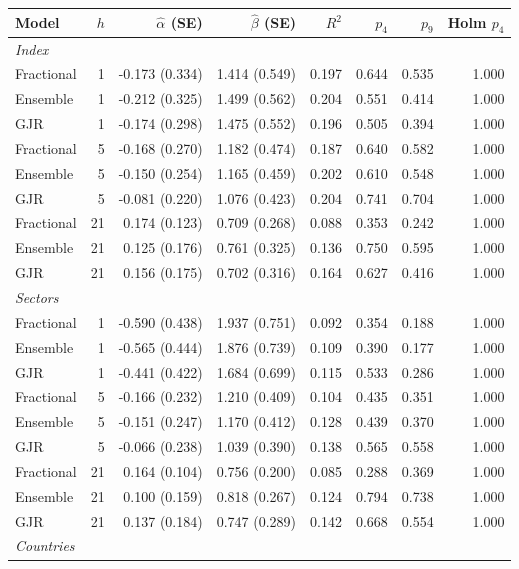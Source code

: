 \begin{tabular}{lrrrrrrr}
\toprule
Model & $h$ & $\widehat\alpha$ (SE) & $\widehat\beta$ (SE) & $R^2$ & $p_4$ & $p_9$ & Holm $p_4$ \\
\midrule
\multicolumn{8}{l}{\textit{Index}} \\
Fractional & 1 & -0.173 (0.334) & 1.414 (0.549) & 0.197 & 0.644 & 0.535 & 1.000 \\
Ensemble & 1 & -0.212 (0.325) & 1.499 (0.562) & 0.204 & 0.551 & 0.414 & 1.000 \\
GJR & 1 & -0.174 (0.298) & 1.475 (0.552) & 0.196 & 0.505 & 0.394 & 1.000 \\
Fractional & 5 & -0.168 (0.270) & 1.182 (0.474) & 0.187 & 0.640 & 0.582 & 1.000 \\
Ensemble & 5 & -0.150 (0.254) & 1.165 (0.459) & 0.202 & 0.610 & 0.548 & 1.000 \\
GJR & 5 & -0.081 (0.220) & 1.076 (0.423) & 0.204 & 0.741 & 0.704 & 1.000 \\
Fractional & 21 & 0.174 (0.123) & 0.709 (0.268) & 0.088 & 0.353 & 0.242 & 1.000 \\
Ensemble & 21 & 0.125 (0.176) & 0.761 (0.325) & 0.136 & 0.750 & 0.595 & 1.000 \\
GJR & 21 & 0.156 (0.175) & 0.702 (0.316) & 0.164 & 0.627 & 0.416 & 1.000 \\
\multicolumn{8}{l}{\textit{Sectors}} \\
Fractional & 1 & -0.590 (0.438) & 1.937 (0.751) & 0.092 & 0.354 & 0.188 & 1.000 \\
Ensemble & 1 & -0.565 (0.444) & 1.876 (0.739) & 0.109 & 0.390 & 0.177 & 1.000 \\
GJR & 1 & -0.441 (0.422) & 1.684 (0.699) & 0.115 & 0.533 & 0.286 & 1.000 \\
Fractional & 5 & -0.166 (0.232) & 1.210 (0.409) & 0.104 & 0.435 & 0.351 & 1.000 \\
Ensemble & 5 & -0.151 (0.247) & 1.170 (0.412) & 0.128 & 0.439 & 0.370 & 1.000 \\
GJR & 5 & -0.066 (0.238) & 1.039 (0.390) & 0.138 & 0.565 & 0.558 & 1.000 \\
Fractional & 21 & 0.164 (0.104) & 0.756 (0.200) & 0.085 & 0.288 & 0.369 & 1.000 \\
Ensemble & 21 & 0.100 (0.159) & 0.818 (0.267) & 0.124 & 0.794 & 0.738 & 1.000 \\
GJR & 21 & 0.137 (0.184) & 0.747 (0.289) & 0.142 & 0.668 & 0.554 & 1.000 \\
\multicolumn{8}{l}{\textit{Countries}} \\

\end{tabular}

